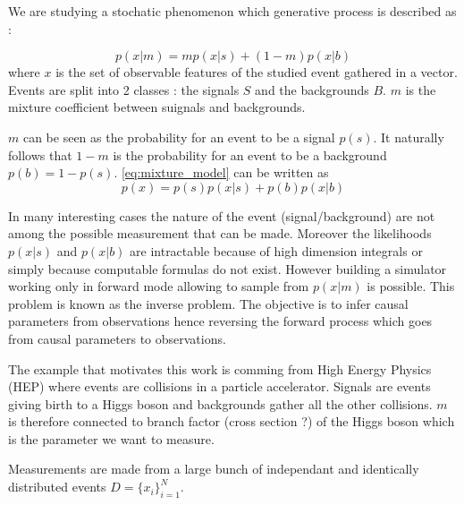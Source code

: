 


We are studying a stochatic phenomenon which generative process is described as :

\begin{equation}
	\label{eq:mixture_model}
	p(x|m) = m p(x|s) + (1-m) p(x|b)
\end{equation}
where $x$ is the set of observable features of the studied event gathered in a vector.
Events are split into 2 classes : the signals $S$ and the backgrounds $B$.
$m$ is the mixture coefficient between suignals and backgrounds.

$m$ can be seen as the probability for an event to be a signal $p(s)$. 
It naturally follows that $1-m$ is the probability for an event to be a background $p(b)=1-p(s)$.
\autoref{eq:mixture_model} can be written as
\begin{equation}
	p(x) = p(s)p(x|s) + p(b)p(x|b)
\end{equation}

In many interesting cases the nature of the event (signal/background) are not among the possible measurement that can be made.
Moreover the likelihoods $p(x|s)$ and $p(x|b)$ are intractable because of high dimension integrals or simply because computable formulas do not exist.
However building a simulator working only in forward mode allowing to sample from $p(x|m)$ is possible.
This problem is known as the inverse problem. 
The objective is to infer causal parameters from observations hence reversing the forward process which goes from causal parameters to observations.


The example that motivates this work is comming from High Energy Physics (HEP) where events are collisions in a particle accelerator.
Signals are events giving birth to a Higgs boson and backgrounds gather all the other collisions.
$m$ is therefore connected to branch factor (cross section ?) of the Higgs boson which is the parameter we want to measure.


Measurements are made from a large bunch of independant and identically distributed events $D=\{x_i\}_{i=1}^N$.

